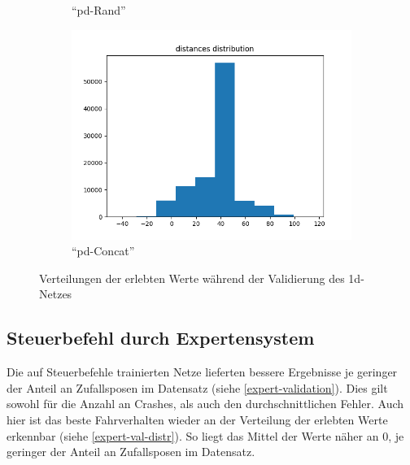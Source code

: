 \begin{figure}[H]
\begin{subfigure}[h]{0.3\textwidth}
		\caption{``\acs{pd}-Rand''}
		\label{1d-pd-rand-val-distr}
	\end{subfigure}
	\begin{subfigure}[h]{0.3\textwidth}
		\centering
		\includegraphics[width=\linewidth]{kapitel5/images/eval/d-only/pd-concat-distr.png}
		\caption{``\acs{pd}-Concat''}
		\label{1d-pd-concat-val-distr}
	\end{subfigure}
	\caption{Verteilungen der erlebten Werte während der Validierung des \acs{1d}-Netzes}
	\label{1d-val-distr}
\end{figure}

\subsection{Steuerbefehl durch Expertensystem}

Die auf Steuerbefehle trainierten Netze lieferten bessere Ergebnisse je geringer der Anteil an Zufallsposen im Datensatz (siehe \ref{expert-validation}). Dies gilt sowohl für die Anzahl an Crashes, als auch den durchschnittlichen Fehler.
Auch hier ist das beste Fahrverhalten wieder an der Verteilung der erlebten Werte erkennbar (siehe \ref{expert-val-distr}). So liegt das Mittel der Werte näher an 0, je geringer der Anteil an Zufallsposen im Datensatz.

